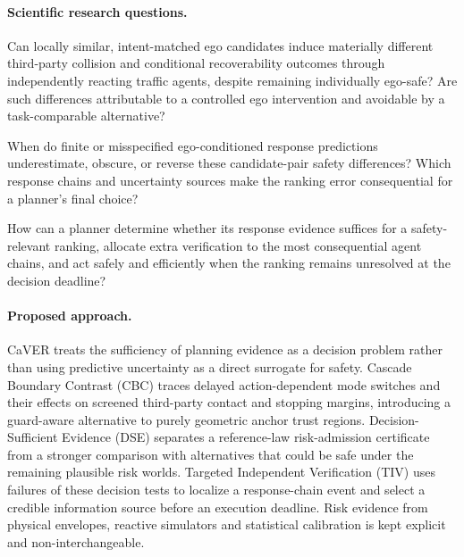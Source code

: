 \documentclass[10pt]{article}
\begin{document}
\paragraph{Scientific research questions.}
\begin{description}[style=nextline,itemsep=3pt]
 \item[\textbf{RQ1 --- Action-Dependent Cascading Safety.}]
 Can locally similar, intent-matched ego candidates induce materially different third-party collision and conditional recoverability outcomes through independently reacting traffic agents, despite remaining individually ego-safe? Are such differences attributable to a controlled ego intervention and avoidable by a task-comparable alternative?
 \item[\textbf{RQ2 --- Decision-Critical Response Discriminability.}]
 When do finite or misspecified ego-conditioned response predictions underestimate, obscure, or reverse these candidate-pair safety differences? Which response chains and uncertainty sources make the ranking error consequential for a planner's final choice?
 \item[\textbf{RQ3 --- Decision Reliability under Limited Evidence.}]
 How can a planner determine whether its response evidence suffices for a safety-relevant ranking, allocate extra verification to the most consequential agent chains, and act safely and efficiently when the ranking remains unresolved at the decision deadline?
\end{description}

\paragraph{Proposed approach.}
CaVER treats the sufficiency of planning evidence as a decision problem rather than using predictive uncertainty as a direct surrogate for safety. Cascade Boundary Contrast (CBC) traces delayed action-dependent mode switches and their effects on screened third-party contact and stopping margins, introducing a guard-aware alternative to purely geometric anchor trust regions. Decision-Sufficient Evidence (DSE) separates a reference-law risk-admission certificate from a stronger comparison with alternatives that could be safe under the remaining plausible risk worlds. Targeted Independent Verification (TIV) uses failures of these decision tests to localize a response-chain event and select a credible information source before an execution deadline. Risk evidence from physical envelopes, reactive simulators and statistical calibration is kept explicit and non-interchangeable.
\end{document}
